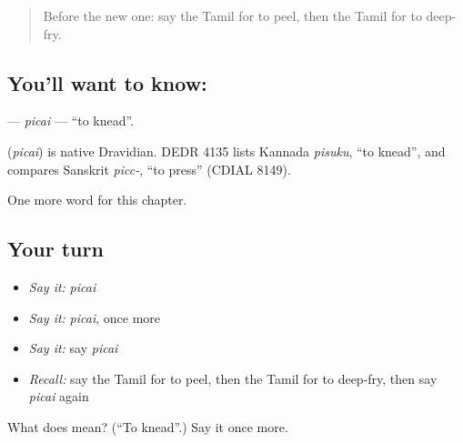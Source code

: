 \label{lesson:TA-C194-picai}



\begin{quote}
Before the new one: say the Tamil for to peel, then the Tamil for to deep-fry.
\end{quote}

\subsection*{You'll want to know: }
\textbf{} — \emph{picai} — \textquotedblleft{}to knead\textquotedblright{}.

\begin{cousinweb}
\textbf{} (\emph{picai}) is native Dravidian. DEDR 4135 lists Kannada \emph{pisuku}, \textquotedblleft{}to knead\textquotedblright{}, and compares Sanskrit \emph{picc-}, \textquotedblleft{}to press\textquotedblright{} (CDIAL 8149).
\end{cousinweb}

\begin{grammarlens}[title={What you've built}]
One more word for this chapter.
\end{grammarlens}

\subsection*{Your turn}
\begin{itemize}
\raggedright
  \item \emph{Say it:} \emph{picai}
  \item \emph{Say it:} \emph{picai}, once more
  \item \emph{Say it:} say \emph{picai}
  \item \emph{Recall:} say the Tamil for to peel, then the Tamil for to deep-fry, then say \emph{picai} again
\end{itemize}

\begin{tcolorbox}[breakable,colback=teal!4,colframe=teal!35!black,title={Before you move on}]
What does  mean? (\textquotedblleft{}To knead\textquotedblright{}.) Say it once more.
\end{tcolorbox}
